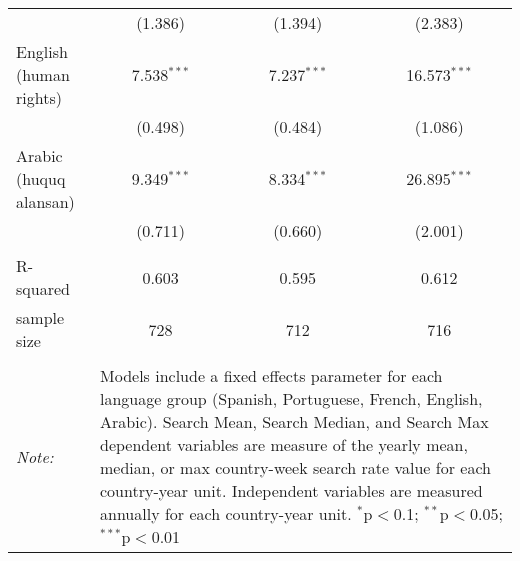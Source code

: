 \begin{table}[!htbp]
\begin{tabular}{@{\extracolsep{5pt}}lccc}
  & (1.386) & (1.394) & (2.383) \\ 
  English (human rights) & 7.538$^{***}$ & 7.237$^{***}$ & 16.573$^{***}$ \\ 
  & (0.498) & (0.484) & (1.086) \\ 
  Arabic (huquq alansan) & 9.349$^{***}$ & 8.334$^{***}$ & 26.895$^{***}$ \\ 
  & (0.711) & (0.660) & (2.001) \\ 
 \hline \\[-1.8ex] 
R-squared  & 0.603 & 0.595 & 0.612 \\ 
sample size  & 728 & 712 & 716 \\ 
\hline 
\hline \\[-1.8ex] 
\textit{Note:}  & \multicolumn{3}{l}{\parbox[t]{8cm}{Models include a fixed effects parameter for each language group (Spanish, Portuguese, French, English, Arabic). Search Mean, Search Median, and Search Max dependent variables are measure of the yearly mean, median, or max country-week search rate value for each country-year unit. Independent variables are measured annually for each country-year unit. $^{*}$p$<$0.1; $^{**}$p$<$0.05; $^{***}$p$<$0.01}} \\ 
\end{tabular} 
\end{table} 
